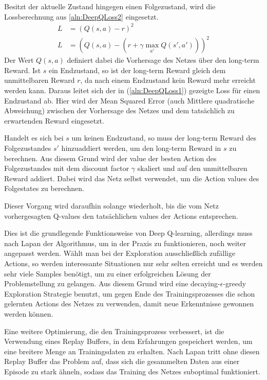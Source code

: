 \documentclass[11pt]{scrartcl}
\begin{document}
Besitzt der aktuelle Zustand hingegen einen Folgezustand, wird die Lossberechnung
aus \autoref{aln:DeepQLoss2} eingesetzt.
\begin{align}
  L & = \left(Q(s, a) - r\right)^2 \label{aln:DeepQLoss1} \\
  L & = \left(Q(s, a) - \left(r + \gamma \max_{a'} Q(s', a')\right)\right)^2 \label{aln:DeepQLoss2}
\end{align}
\noindent
Der Wert $Q(s, a)$ definiert dabei die Vorhersage des Netzes über den long-term Reward.
Ist $s$ ein Endzustand, so ist der long-term Reward gleich dem unmittelbaren Reward $r$,
da nach einem Endzustand kein Reward mehr erreicht werden kann. Daraus leitet sich der in
(\ref{aln:DeepQLoss1}) gezeigte Loss für einen Endzustand ab. Hier wird der Mean Squared
Error (auch Mittlere quadratische Abweichung) zwischen der Vorhersage des Netzes und dem
tatsächlich zu erwartenden Reward eingesetzt.

Handelt es sich bei $s$ um keinen Endzustand, so muss der long-term Reward des
Folgezustandes $s'$ hinzuaddiert werden, um den long-term Reward in $s$ zu berechnen. Aus
diesem Grund wird der value der besten Action des Folgezustandes mit dem discount factor
$\gamma$ skaliert und auf den unmittelbaren Reward addiert. Dabei wird das Netz selbst
verwendet, um die Action values des Folgestates zu berechnen.

Dieser Vorgang wird daraufhin solange wiederholt, bis die vom Netz vorhergesagten Q-values
den tat\-säch\-lich\-en values der Actions entsprechen.

Dies ist die grundlegende Funktionsweise von Deep Q-learning, allerdings muss nach Lapan
\cite[~S.202]{L2018} der Algorithmus, um in der Praxis zu funktionieren, noch weiter
angepasst werden. Wählt man bei der Exploration ausschließlich zufällige Actions, so
werden interessante Situationen nur sehr selten erreicht und es werden sehr viele Samples
benötigt, um zu einer erfolgreichen Lösung der Problemstellung zu gelangen. Aus diesem
Grund wird eine decaying-$\epsilon$-greedy Exploration Strategie benutzt, um gegen Ende
des Trainingsprozesses die schon gelernten Actions des Netzes zu verwenden, damit neue
Erkenntnisse gewonnen werden können.

Eine weitere Optimierung, die den Trainingsprozess verbessert, ist die Verwendung eines
Replay Buffers, in dem Erfahrungen gespeichert werden, um eine breitere Menge an
Trainingsdaten zu erhalten. Nach Lapan \cite[~S.204]{L2018} tritt ohne diesen Replay
Buffer das Problem auf, dass sich die gesammelten Daten aus einer Episode zu stark
ähneln, sodass das Training des Netzes suboptimal funktioniert.
\end{document}
